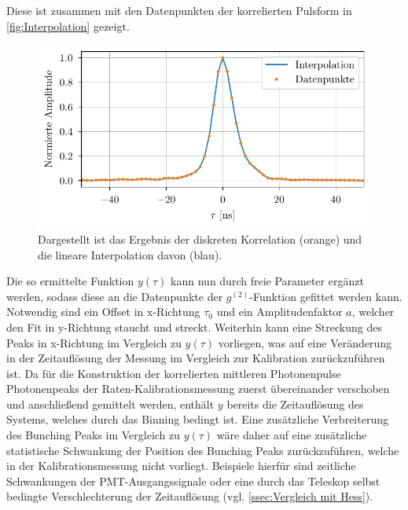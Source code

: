 Diese ist zusammen mit den Datenpunkten der korrelierten Pulsform in \autoref{fig:Interpolation} gezeigt. 
\begin{figure}[h]
    \centering
    \includegraphics{images/Analysis/interpolation.pdf}
    \caption{Dargestellt ist das Ergebnis der diskreten Korrelation (orange) und die lineare Interpolation davon (blau).}
    \label{fig:Interpolation}
\end{figure}
Die so ermittelte Funktion $y(\tau)$ kann nun durch freie Parameter ergänzt werden, sodass diese an die Datenpunkte der $g^{(2)}$-Funktion gefittet werden kann. 
Notwendig sind ein Offset in x-Richtung $\tau_0$ und ein Amplitudenfaktor $a$, welcher den Fit in y-Richtung staucht und streckt. 
Weiterhin kann eine Streckung des Peaks in x-Richtung im Vergleich zu $y(\tau)$ vorliegen, was auf eine Veränderung in der Zeitauflösung der Messung im Vergleich zur Kalibration zurückzuführen ist. 
Da für die Konstruktion der korrelierten mittleren Photonenpulse Photonenpeaks der Raten-Kalibrationsmessung zuerst übereinander verschoben und anschließend gemittelt werden, enthält $y$ bereits die Zeitauflösung des Systems, welches durch das Binning bedingt ist. 
Eine zusätzliche Verbreiterung des Bunching Peaks im Vergleich zu $y(\tau)$ wäre daher auf eine zusätzliche statistische Schwankung der Position des Bunching Peaks zurückzuführen, welche in der Kalibrationsmessung nicht vorliegt. 
Beispiele hierfür sind zeitliche Schwankungen der PMT-Ausgangssignale oder eine durch das Teleskop selbst bedingte Verschlechterung der Zeitauflösung (vgl. \autoref{ssec:Vergleich mit Hess}).

